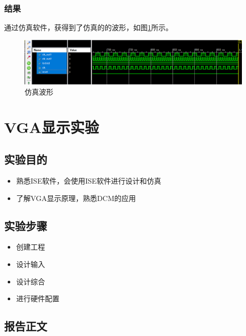 \documentclass{ctexart}
\begin{document}
        \subsubsection{结果}
        
        通过仿真软件，获得到了仿真的的波形，如图\ref{fig:report2-clock-1}所示。
        \begin{figure}
\centering
\includegraphics[width=1\linewidth]{report2-clock-1}
\caption{仿真波形}
\label{fig:report2-clock-1}
        \end{figure}


         
         \section{VGA显示实验}
         
         \subsection{实验目的}
         \begin{itemize}
             \item 熟悉ISE软件，会使用ISE软件进行设计和仿真
             \item 了解VGA显示原理，熟悉DCM的应用
            \end{itemize}
            
            \subsection{实验步骤}
            
            \begin{itemize}
                \item 创建工程
                \item 设计输入
                \item 设计综合
                \item 进行硬件配置
                
            \end{itemize}
            
            \subsection{报告正文}
            
\end{document}
